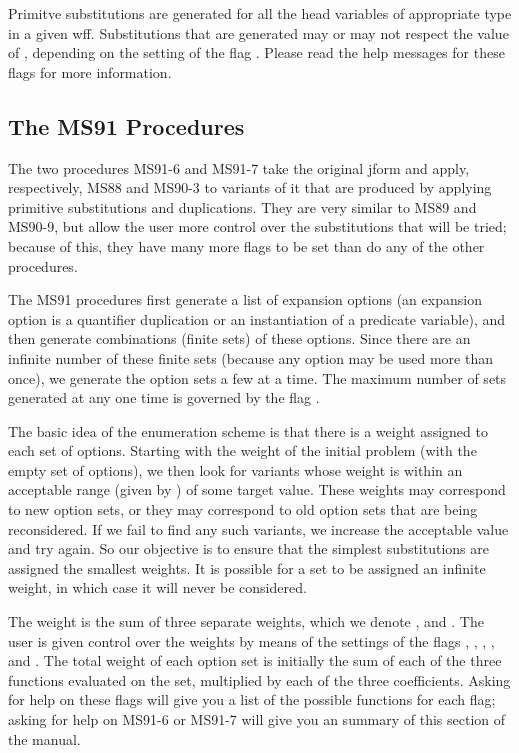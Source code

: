 Primitve substitutions are generated for all the head variables of appropriate
type in a given wff.
Substitutions that are generated may or may not respect the
value of , depending on the setting of the
flag . Please read the help messages for these
flags for more information.

\subsection{The MS91 Procedures}
\label{ms91}

The two procedures MS91-6 and MS91-7 take the original jform and apply, respectively,
MS88 and MS90-3 to variants of it that are produced by applying primitive substitutions
and duplications. They are very similar to MS89 and MS90-9, but allow the user more
control over the substitutions that will be tried; because of this, they have many more
flags to be set than do any of the other procedures.

The MS91 procedures first generate a list of expansion options
(an expansion option is a quantifier duplication or an
instantiation of a predicate variable), and
then generate combinations (finite sets) of these options. Since there
are an infinite number of these finite sets (because any option may be
used more than once), we generate the option sets a few at a time.
The maximum number of sets generated at any one time is governed
by the flag .

The basic idea of the enumeration scheme is that there is a
weight assigned to each set of options. Starting with the weight
of the initial problem (with the empty set of options), we then
look for variants whose weight is within an acceptable range (given by
) of some target value. These weights
may correspond to new option sets, or they may correspond to old option
sets that are being reconsidered. If we fail
to find any such variants, we increase the acceptable value and try again.
So our objective is to ensure that the simplest substitutions are assigned
the smallest weights. It is possible for a set to be assigned an infinite
weight, in which case it will never be considered.

The weight is the sum of three
separate weights, which we denote , 
and . The user is given control over the
weights by means of the settings of the flags ,
, , ,
 and .
The total weight of each option set is initially the sum of each of the three
functions evaluated on the set, multiplied by each of the three
coefficients. Asking for help on these flags will give you a list of
the possible functions for each flag; asking for help on MS91-6 or MS91-7
will give you an summary of this section of the manual.

